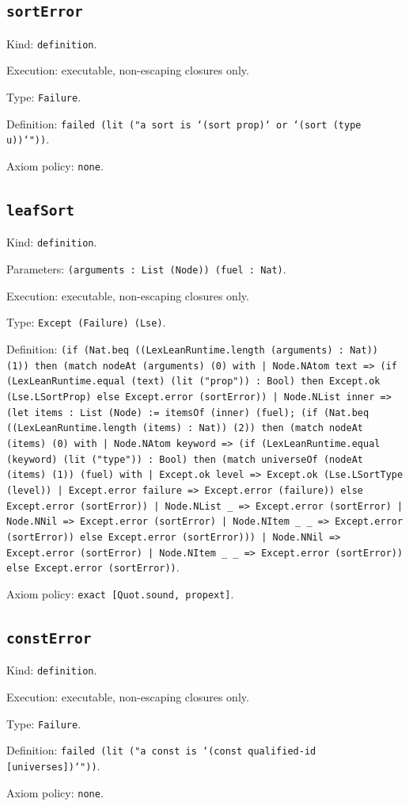 \documentclass[11pt]{article}
\begin{document}
\subsection*{\texttt{sortError}}
\noindent Kind: \texttt{definition}.\par
\noindent Execution: executable, non-escaping closures only.\par
\noindent Type: \texttt{Failure}.\par
\noindent Definition: \texttt{failed (lit ("a sort is `(sort prop)` or `(sort (type u))`"))}.\par
\noindent Axiom policy: \texttt{none}.\par
\subsection*{\texttt{leafSort}}
\noindent Kind: \texttt{definition}.\par
\noindent Parameters: \texttt{(arguments : List (Node)) (fuel : Nat)}.\par
\noindent Execution: executable, non-escaping closures only.\par
\noindent Type: \texttt{Except (Failure) (Lse)}.\par
\noindent Definition: \texttt{(if (Nat.beq ((LexLeanRuntime.length (arguments) : Nat)) (1)) then (match nodeAt (arguments) (0) with | Node.NAtom text => (if (LexLeanRuntime.equal (text) (lit ("prop")) : Bool) then Except.ok (Lse.LSortProp) else Except.error (sortError)) | Node.NList inner => (let items : List (Node) := itemsOf (inner) (fuel); (if (Nat.beq ((LexLeanRuntime.length (items) : Nat)) (2)) then (match nodeAt (items) (0) with | Node.NAtom keyword => (if (LexLeanRuntime.equal (keyword) (lit ("type")) : Bool) then (match universeOf (nodeAt (items) (1)) (fuel) with | Except.ok level => Except.ok (Lse.LSortType (level)) | Except.error failure => Except.error (failure)) else Except.error (sortError)) | Node.NList \_ => Except.error (sortError) | Node.NNil => Except.error (sortError) | Node.NItem \_ \_ => Except.error (sortError)) else Except.error (sortError))) | Node.NNil => Except.error (sortError) | Node.NItem \_ \_ => Except.error (sortError)) else Except.error (sortError))}.\par
\noindent Axiom policy: \texttt{exact [Quot.sound, propext]}.\par
\subsection*{\texttt{constError}}
\noindent Kind: \texttt{definition}.\par
\noindent Execution: executable, non-escaping closures only.\par
\noindent Type: \texttt{Failure}.\par
\noindent Definition: \texttt{failed (lit ("a const is `(const qualified-id [universes])`"))}.\par
\noindent Axiom policy: \texttt{none}.\par
\end{document}
